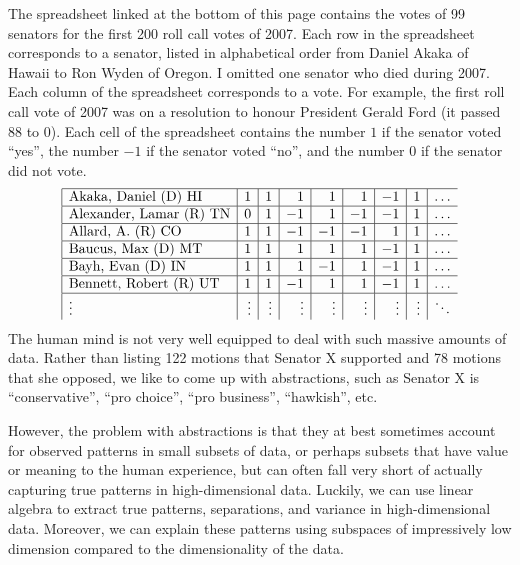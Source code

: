\documentclass{ximera}
\begin{document}
The spreadsheet linked at the bottom of this page contains the votes of 99 senators for the first 200
roll call votes of 2007. Each row in the spreadsheet corresponds to a
senator, listed in alphabetical order from Daniel Akaka of Hawaii to
Ron Wyden of Oregon. I omitted one senator who died during 2007. Each
column of the spreadsheet corresponds to a vote. For example, the
first roll call vote of 2007 was on a resolution to honour President
Gerald Ford (it passed 88 to 0). Each cell of the spreadsheet contains
the number $1$ if the senator voted ``yes'', the number $-1$ if the
senator voted ``no'', and the number $0$ if the senator did not
vote. 
\begin{equation*}
  \begin{array}{|l|r|r|r|r|r|r|r|r}
    \hline
    \mbox{Akaka, Daniel (D) HI} & 1 & 1 & 1 & 1 & 1 & -1 & 1 & \ldots \\\hline
    \mbox{Alexander, Lamar (R) TN} & 0 & 1 & -1 & 1 & -1 & -1 & 1 & \ldots \\\hline
    \mbox{Allard, A. (R) CO} & 1 & 1 & -1 & -1 & -1 & 1 & 1 & \ldots \\\hline
    \mbox{Baucus, Max (D) MT} & 1 & 1 & 1 & 1 & 1 & -1 & 1 & \ldots \\\hline
    \mbox{Bayh, Evan (D) IN} & 1 & 1 & 1 & -1 & 1 & -1 & 1 & \ldots \\\hline
    \mbox{Bennett, Robert (R) UT} & 1 & 1 & -1 & 1 & 1 & -1 & 1 & \ldots \\\hline
    \mbox{\vdots} & \vdots & \vdots & \vdots & \vdots & \vdots & \vdots & \vdots & \ddots
  \end{array}
\end{equation*}
The human mind is not very well equipped to deal with such massive
amounts of data. Rather than listing 122 motions that Senator X
supported and 78 motions that she opposed, we like to come up with
abstractions, such as Senator X is ``conservative'', ``pro choice'',
``pro business'', ``hawkish'', etc. 

However, the problem with
abstractions is that they at best sometimes account for observed patterns in small subsets of data, or perhaps subsets that have value or meaning to the human experience, but can often fall very short of actually capturing true patterns in high-dimensional data. Luckily, we can use linear algebra to extract true patterns, separations, and variance in high-dimensional data. Moreover, we can explain these patterns using subspaces of impressively low dimension compared to the dimensionality of the data. 
\end{document}
